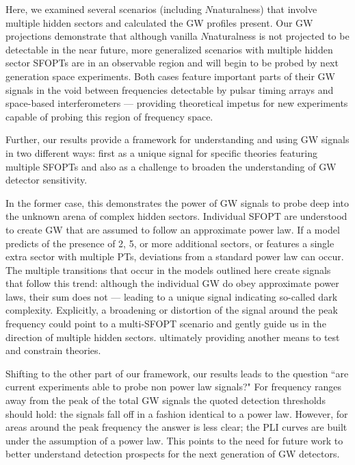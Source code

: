 \documentclass[nofootinbib,twocolumn,preprintnumbers]{revtex4-1}
\begin{document}
Here, we examined several scenarios (including $N$naturalness) that involve multiple hidden sectors and calculated the GW profiles present. Our GW projections demonstrate that although vanilla $N$naturalness is not projected to be detectable in the near future, more generalized scenarios with multiple hidden sector SFOPTs are in an observable region and will begin to be probed by next generation space experiments. Both cases feature important parts of their GW signals in the void between frequencies detectable by pulsar timing arrays and space-based interferometers --- providing theoretical impetus for new experiments capable of probing this region of frequency space. 

Further, our results provide a framework for understanding and using GW signals in two different ways: first as a unique signal for specific theories featuring multiple SFOPTs and also as a challenge to broaden the understanding of GW detector sensitivity. 

In the former case, this demonstrates the power of GW signals to probe deep into the unknown arena of complex hidden sectors. Individual SFOPT are understood to create GW that are assumed to follow an approximate power law. If a model predicts of the presence of 2, 5, or more additional sectors, or features a single extra sector with multiple PTs, deviations from a standard power law can occur. The multiple transitions that occur in the models outlined here create signals that follow this trend: although the individual GW do obey approximate power laws, their sum does not --- leading to a unique signal indicating so-called dark complexity. Explicitly, a broadening or distortion of the signal around the peak frequency could point to a multi-SFOPT scenario and gently guide us in the direction of multiple hidden sectors. ultimately providing another means to test and constrain theories.   

Shifting to the other part of our framework, our results leads to the question ``are current experiments able to probe non power law signals?" For frequency ranges away from the peak of the total GW signals the quoted detection thresholds should hold: the signals fall off in a fashion identical to a power law. However, for areas around the peak frequency the answer is less clear; the PLI curves are built under the assumption of a power law. This points to the need for future work to better understand detection prospects for the next generation of GW detectors. 

\end{document}
